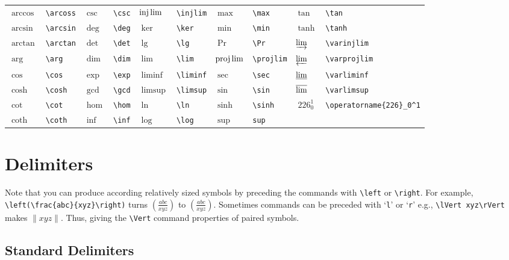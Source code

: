 \documentclass[10pt, english]{article}
\begin{document}
	\begin{center}
		\scriptsize
	\begin{tabular}{ll|ll|ll|ll|ll}
		$\arccos$ & \verb|\arcoss| & $\csc$ & \verb|\csc| & $\injlim$ & \verb|\injlim| & $\max$ & \verb|\max| & $\tan$ & \verb|\tan| \\
		$\arcsin$ & \verb|\arcsin| & $\deg$ & \verb|\deg| & $\ker$ & \verb|\ker| & $\min$ & \verb|\min| & $\tanh$ & \verb|\tanh| \\
		$\arctan$ & \verb|\arctan| & $\det$ & \verb|\det| & $\lg$ & \verb|\lg| & $\Pr$ & \verb|\Pr| & $\varinjlim$ & \verb|\varinjlim| \\
		$\arg$ & \verb|\arg| & $\dim$ & \verb|\dim| & $\lim$ & \verb|\lim| & $\projlim$ & \verb|\projlim| & $\varprojlim$ & \verb|\varprojlim| \\
		$\cos$ & \verb|\cos| & $\exp$ & \verb|\exp| & $\liminf$ & \verb|\liminf| & $\sec$ & \verb|\sec| & $\varliminf$ & \verb|\varliminf| \\
		$\cosh$ & \verb|\cosh| & $\gcd$ & \verb|\gcd| & $\limsup$ & \verb|\limsup| & $\sin$ & \verb|\sin| & $\varlimsup$ & \verb|\varlimsup| \\
		$\cot$ & \verb|\cot| & $\hom$ & \verb|\hom| & $\ln$ & \verb|\ln| & $\sinh$ & \verb|\sinh| & $\operatorname{226}_0^1$ & \verb|\operatorname{226}_0^1| \\
		$\coth$ & \verb|\coth| & $\inf$ & \verb|\inf| & $\log$ & \verb|\log| & $\sup$ & \verb|sup| \\ 
	\end{tabular}
	\end{center}

	\newpage

\section{Delimiters}

	Note that you can produce according relatively sized symbols by preceding the commands with \verb|\left| or \verb|\right|. For example, \verb|\left(\frac{abc}{xyz}\right)| turns $(\frac{abc}{xyz})$ to $\left(\frac{abc}{xyz}\right)$. Sometimes commands can be preceded with  `\verb|l|' or `\verb|r|' e.g., \verb|\lVert xyz\rVert| makes $\lVert xyz\rVert$. Thus, giving the \verb|\Vert| command properties of paired symbols.

	\subsection{Standard Delimiters}
\end{document}
